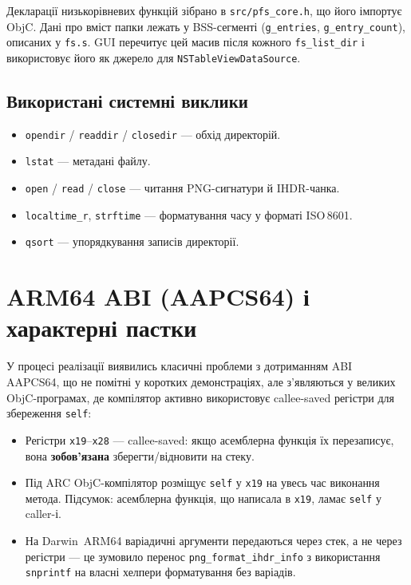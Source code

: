 \documentclass[12pt,a4paper]{article}
\begin{document}
Декларації низькорівневих функцій зібрано в \texttt{src/pfs\_core.h},
що його імпортує ObjC. Дані про вміст папки лежать у BSS-сегменті
(\texttt{g\_entries}, \texttt{g\_entry\_count}), описаних у
\texttt{fs.s}. GUI перечитує цей масив після кожного
\texttt{fs\_list\_dir} і використовує його як джерело для
\texttt{NSTableViewDataSource}.

\subsection{Використані системні виклики}

\begin{itemize}
  \item \texttt{opendir} / \texttt{readdir} / \texttt{closedir} ---
        обхід директорій.
  \item \texttt{lstat} --- метадані файлу.
  \item \texttt{open} / \texttt{read} / \texttt{close} ---
        читання PNG-сигнатури й IHDR-чанка.
  \item \texttt{localtime\_r}, \texttt{strftime} ---
        форматування часу у форматі ISO\,8601.
  \item \texttt{qsort} --- упорядкування записів директорії.
\end{itemize}

\section{ARM64 ABI (AAPCS64) і характерні пастки}

У процесі реалізації виявились класичні проблеми з дотриманням
ABI AAPCS64, що не помітні у коротких демонстраціях, але з'являються
у великих ObjC-програмах, де компілятор активно використовує
callee-saved регістри для збереження \texttt{self}:

\begin{itemize}
  \item Регістри \texttt{x19}--\texttt{x28} --- callee-saved:
        якщо асемблерна функція їх перезаписує, вона \textbf{зобов'язана}
        зберегти/відновити на стеку.
  \item Під ARC ObjC-компілятор розміщує \texttt{self} у \texttt{x19}
        на увесь час виконання метода. Підсумок: асемблерна функція,
        що написала в \texttt{x19}, ламає \texttt{self} у caller-і.
  \item На Darwin~ARM64 варіадичні аргументи передаються через стек,
        а не через регістри --- це зумовило перенос
        \texttt{png\_format\_ihdr\_info} з використання \texttt{snprintf}
        на власні хелпери форматування без варіадів.
\end{itemize}
\end{document}
